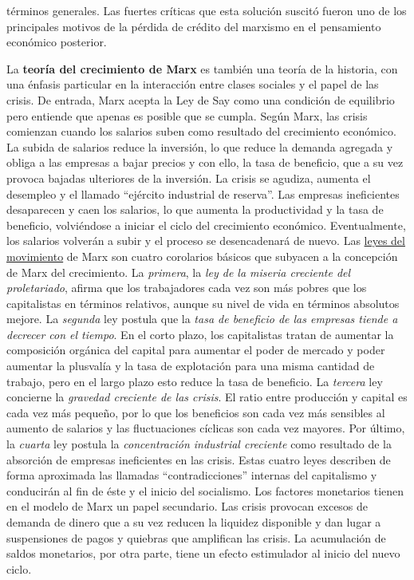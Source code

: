 \documentclass{nuevotema}
\begin{document}
términos generales. Las fuertes críticas que esta solución suscitó fueron uno de los principales motivos de la pérdida de crédito del marxismo en el pensamiento económico posterior.

La \textbf{teoría del crecimiento de Marx} es también una teoría de la historia, con una énfasis particular en la interacción entre clases sociales y el papel de las crisis. De entrada, Marx acepta la Ley de Say como una condición de equilibrio pero entiende que apenas es posible que se cumpla. Según Marx, las crisis comienzan cuando los salarios suben como resultado del crecimiento económico. La subida de salarios reduce la inversión, lo que reduce la demanda agregada y obliga a las empresas a bajar precios y con ello, la tasa de beneficio, que a su vez provoca bajadas ulteriores de la inversión. La crisis se agudiza, aumenta el desempleo y el llamado ``ejército industrial de reserva''. Las empresas ineficientes desaparecen y caen los salarios, lo que aumenta la productividad y la tasa de beneficio, volviéndose a iniciar el ciclo del crecimiento económico. Eventualmente, los salarios volverán a subir y el proceso se desencadenará de nuevo. Las \underline{leyes del movimiento} de Marx son cuatro corolarios básicos que subyacen a la concepción de Marx del crecimiento. La \textit{primera}, la \textit{ley de la miseria creciente del proletariado}, afirma que los trabajadores cada vez son más pobres que los capitalistas en términos relativos, aunque su nivel de vida en términos absolutos mejore. La \textit{segunda} ley postula que la \textit{tasa de beneficio de las empresas tiende a decrecer con el tiempo}. En el corto plazo, los capitalistas tratan de aumentar la composición orgánica del capital para aumentar el poder de mercado y poder aumentar la plusvalía y la tasa de explotación para una misma cantidad de trabajo, pero en el largo plazo esto reduce la tasa de beneficio. La \textit{tercera} ley concierne la \textit{gravedad creciente de las crisis}. El ratio entre producción y capital es cada vez más pequeño, por lo que los beneficios son cada vez más sensibles al aumento de salarios y las fluctuaciones cíclicas son cada vez mayores. Por último, la \textit{cuarta} ley postula la \textit{concentración industrial creciente} como resultado de la absorción de empresas ineficientes en las crisis. Estas cuatro leyes describen de forma aproximada las llamadas ``contradicciones'' internas del capitalismo y conducirán al fin de éste y el inicio del socialismo. Los factores monetarios tienen en el modelo de Marx un papel secundario. Las crisis provocan excesos de demanda de dinero que a su vez reducen la liquidez disponible y dan lugar a suspensiones de pagos y quiebras que amplifican las crisis. La acumulación de saldos monetarios, por otra parte, tiene un efecto estimulador al inicio del nuevo ciclo.
\end{document}
